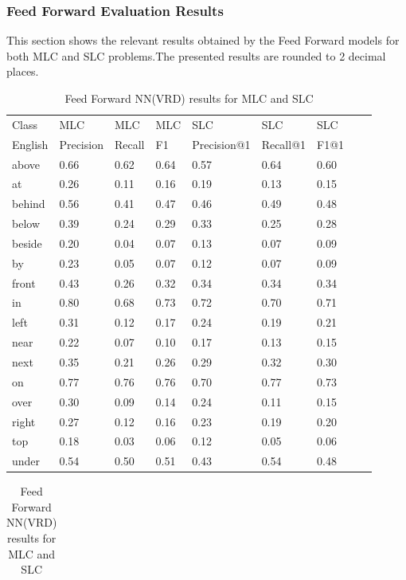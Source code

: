\documentclass{csfyp}
\begin{document}
\subsubsection{Feed Forward Evaluation Results}
This section shows the relevant results obtained by the Feed Forward models for both MLC and SLC problems.The presented results are rounded to 2 decimal places.
\newpage
\begin{table}[!htbp]
\centering
\begin{tabular}{|l|l|l|l|l|l|l|l|l}
\cline{1-7}
Class &  MLC  &  MLC  &  MLC & SLC &  SLC & SLC \\ \cline{1-7}
English & Precision &  Recall    & F1 & Precision@1 & Recall@1 & F1@1 \\ \cline{1-7}
above	&	0.66	&	0.62	&	0.64	&	0.57	&	0.64	&	0.60 \\ \cline{1-7}
at	    &	0.26	&	0.11	&	0.16	&	0.19	&	0.13	&	0.15 \\ \cline{1-7} 
behind	&	0.56	&	0.41	&	0.47	&	0.46	&	0.49	&	0.48 \\ \cline{1-7} 
below	&	0.39	&	0.24	&	0.29	&	0.33	&	0.25	&	0.28 \\ \cline{1-7} 
beside	&	0.20	&	0.04	&	0.07	&	0.13	&	0.07	&	0.09 \\ \cline{1-7} 
by 	    &	0.23	&	0.05	&	0.07	&	0.12	&	0.07	&	0.09 \\ \cline{1-7} 
front	&	0.43	&	0.26	&	0.32	&	0.34	&	0.34	&	0.34 \\ \cline{1-7} 
in   	&	0.80	&	0.68	&	0.73	&	0.72	&	0.70	&	0.71 \\ \cline{1-7} 
left	&	0.31	&	0.12	&	0.17	&	0.24	&	0.19	&	0.21 \\ \cline{1-7} 
near	&	0.22	&	0.07	&	0.10	&	0.17	&	0.13	&	0.15 \\ \cline{1-7}
next	&	0.35	&	0.21	&	0.26	&	0.29	&	0.32	&	0.30 \\ \cline{1-7} 
on	    &	0.77	&	0.76	&	0.76	&	0.70	&	0.77	&	0.73 \\ \cline{1-7} 
over	&	0.30	&	0.09	&	0.14	&	0.24	&	0.11	&	0.15 \\ \cline{1-7} 
right	&	0.27	&	0.12	&	0.16	&	0.23	&	0.19	&	0.20 \\ \cline{1-7} 
top	    &	0.18	&	0.03	&	0.06	&	0.12	&	0.05	&	0.06 \\ \cline{1-7} 
under	&	0.54	&	0.50	&	0.51	&	0.43	&	0.54	&	0.48 \\ \cline{1-7}
\end{tabular}
\caption{Feed Forward NN(VRD) results for MLC and SLC}
\centering
\begin{tabular}{|l|l|l|l|l|l|l|l|l}

\end{tabular}
\end{table}
\end{document}
